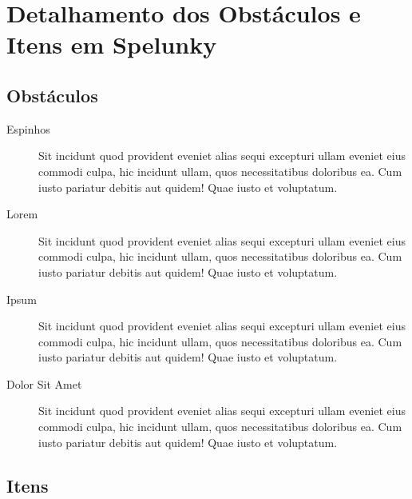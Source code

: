 \chapter{\label{appendix:spelunky-details}Detalhamento dos Obstáculos e
Itens em Spelunky}

\section{\label{section:spelunky-obstacles}Obstáculos}

\begin{description}
    \item[Espinhos]
        Sit incidunt quod provident eveniet alias sequi excepturi ullam eveniet
        eius commodi culpa, hic incidunt ullam, quos necessitatibus doloribus
        ea. Cum iusto pariatur debitis aut quidem! Quae iusto et voluptatum.
    \item[Lorem]
        Sit incidunt quod provident eveniet alias sequi excepturi ullam eveniet
        eius commodi culpa, hic incidunt ullam, quos necessitatibus doloribus
        ea. Cum iusto pariatur debitis aut quidem! Quae iusto et voluptatum.
    \item[Ipsum]
        Sit incidunt quod provident eveniet alias sequi excepturi ullam eveniet
        eius commodi culpa, hic incidunt ullam, quos necessitatibus doloribus
        ea. Cum iusto pariatur debitis aut quidem! Quae iusto et voluptatum.
    \item[Dolor Sit Amet]
        Sit incidunt quod provident eveniet alias sequi excepturi ullam eveniet
        eius commodi culpa, hic incidunt ullam, quos necessitatibus doloribus
        ea. Cum iusto pariatur debitis aut quidem! Quae iusto et voluptatum.
\end{description}

\section{\label{section:spelunky-items}Itens}


